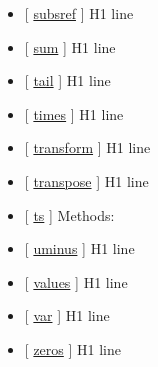 \documentclass[letterpaper,10pt,english]{sphinxmanual}
\begin{document}
\begin{itemize}
\item {} 
{[} {\hyperref[classes/time_series/@ts/ts:subsref]{subsref}} {]}   H1 line

\item {} 
{[} {\hyperref[classes/time_series/@ts/ts:sum]{sum}} {]}   H1 line

\item {} 
{[} {\hyperref[classes/time_series/@ts/ts:tail]{tail}} {]}   H1 line

\item {} 
{[} {\hyperref[classes/time_series/@ts/ts:times]{times}} {]}   H1 line

\item {} 
{[} {\hyperref[classes/time_series/@ts/ts:transform]{transform}} {]}   H1 line

\item {} 
{[} {\hyperref[classes/time_series/@ts/ts:transpose]{transpose}} {]}   H1 line

\item {} 
{[} {\hyperref[classes/time_series/@ts/ts:ts]{ts}} {]} Methods:

\item {} 
{[} {\hyperref[classes/time_series/@ts/ts:uminus]{uminus}} {]}   H1 line

\item {} 
{[} {\hyperref[classes/time_series/@ts/ts:values]{values}} {]}   H1 line

\item {} 
{[} {\hyperref[classes/time_series/@ts/ts:var]{var}} {]}   H1 line

\item {} 
{[} {\hyperref[classes/time_series/@ts/ts:zeros]{zeros}} {]}   H1 line

\end{itemize}
\end{document}
